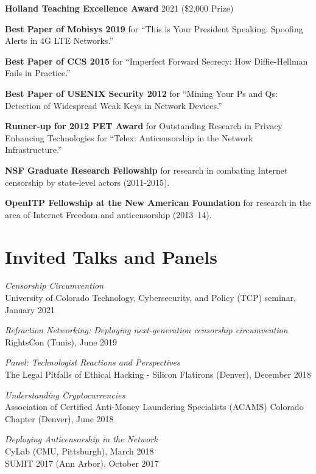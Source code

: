 \documentclass[margin,11pt]{res} %
\begin{document}
    \textbf{Holland Teaching Excellence Award} 2021 (\$2,000 Prize)

    \textbf{Best Paper of Mobisys 2019}
    for ``This is Your President Speaking: Spoofing Alerts in 4G LTE Networks.''

    \textbf{Best Paper of CCS 2015}
    for ``Imperfect Forward Secrecy: How Diffie-Hellman Fails in Practice.''

    \textbf{Best Paper of USENIX Security 2012}
    for ``Mining Your Ps and Qs: Detection of Widespread Weak Keys in Network Devices.''

    \textbf{Runner-up for 2012 PET Award} for Outstanding Research in Privacy Enhancing Technologies for ``Telex: Anticensorship in the Network Infrastructure.''


    \textbf{NSF Graduate Research Fellowship}
    for research in combating Internet censorship by state-level actors (2011-2015).
    
    \textbf{OpenITP Fellowship at the New American Foundation}
    for research in the area of Internet Freedom and anticensorship (2013--14).

\vspace{6pt}
\section{\large Invited Talks and Panels}

\emph{Censorship Circumvention} \\
    University of Colorado Technology, Cybersecurity, and Policy (TCP) seminar, January 2021

\emph{Refraction Networking: Deploying next-generation censorship circumvention} \\
    RightsCon (Tunis), June 2019

\emph{Panel: Technologist Reactions and Perspectives} \\
    The Legal Pitfalls of Ethical Hacking - Silicon Flatirons (Denver), December 2018

\emph{Understanding Cryptocurrencies} \\
    Association of Certified Anti-Money Laundering Specialists (ACAMS) Colorado Chapter (Denver), June 2018

\emph{Deploying Anticensorship in the Network} \\
    CyLab (CMU, Pittsburgh), March 2018 \\
    SUMIT 2017 (Ann Arbor), October 2017
\end{document}
